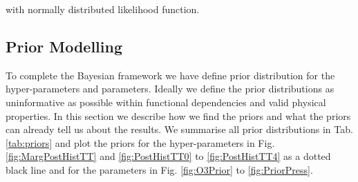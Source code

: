 with normally distributed likelihood function.
\subsection{Prior Modelling}
To complete the Bayesian framework we have define prior distribution for the hyper-parameters and parameters.
Ideally we define the prior distributions as uninformative as possible within functional dependencies and valid physical properties.
In this section we describe how we find the priors and what the priors can already tell us about the results.
We summarise all prior distributions in Tab. \ref{tab:priors} and plot the priors for the hyper-parameters in Fig. \ref{fig:MargPostHistTT} and \ref{fig:PostHistTT0}  to \ref{fig:PostHistTT4} as a dotted black line and for the parameters in Fig. \ref{fig:O3Prior} to \ref{fig:PriorPress}.

